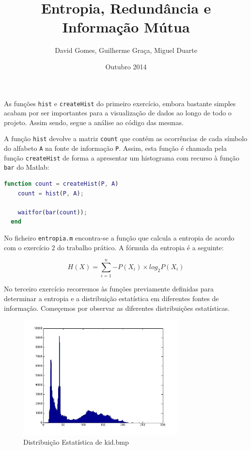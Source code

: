 \documentclass{article}
\title{Entropia, Redundância e Informação Mútua}
\author{David Gomes, Guilherme Graça, Miguel Duarte}
\date{Outubro 2014}
\begin{document}
\maketitle
  As funções \texttt{hist} e \texttt{createHist} do primeiro exercício, embora bastante
  simples acabam por ser importantes para a visualização de dados ao longo
  de todo o projeto. Assim sendo, segue a análise ao código das mesmas.

  A função \texttt{hist} devolve a matriz \texttt{count} que contém as ocorrências
  de cada símbolo do alfabeto \texttt{A} na fonte de informação \texttt{P}. Assim,
  esta função é chamada pela função \texttt{createHist} de forma a apresentar um histograma
  com recurso à função \texttt{bar} do Matlab:

  \vspace{2mm}
  \begin{lstlisting}[language=Matlab]
  function count = createHist(P, A)
    count = hist(P, A);

    waitfor(bar(count));
  end
  \end{lstlisting}

  No ficheiro \texttt{entropia.m} encontra-se a função que calcula a entropia de acordo
  com o exercício 2 do trabalho prático. A fórmula da entropia é a seguinte:

  $$
    H(X) = \sum_{i=1}^{n}{-P(X_i) \times log_2 P(X_i)}
  $$

  No terceiro exercício recorremos às funções previamente definidas para determinar
  a entropia e a distribuição estatística em diferentes fontes de informação.
  Começemos por observar as diferentes distribuições estatísticas.

  \begin{figure}[H]
    \centering
      \includegraphics[width=0.75\textwidth]{ex3kid}
    \caption{Distribuição Estatística de kid.bmp}
  \end{figure}
\end{document}
